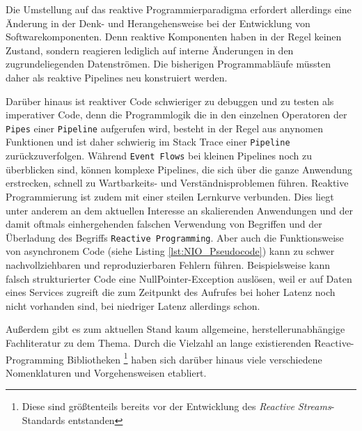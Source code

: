 Die Umstellung auf das reaktive Programmierparadigma erfordert allerdings eine Änderung in der Denk- und Herangehensweise bei der
Entwicklung von Softwarekomponenten. Denn reaktive Komponenten haben in der Regel keinen Zustand,
sondern reagieren lediglich auf interne Änderungen in den zugrundeliegenden Datenströmen.
Die bisherigen Programmabläufe müssten daher als reaktive Pipelines neu konstruiert werden.

Darüber hinaus ist reaktiver Code schwieriger zu debuggen und zu testen als imperativer Code, denn die Programmlogik die in den einzelnen Operatoren
der \verb|Pipes| einer \verb|Pipeline| aufgerufen wird, besteht in der Regel aus anynomen Funktionen und ist daher schwierig im Stack Trace einer
\verb|Pipeline| zurückzuverfolgen.
Während \verb|Event Flows| bei kleinen Pipelines noch zu überblicken sind, können komplexe Pipelines, die sich über die ganze Anwendung erstrecken,
schnell zu Wartbarkeits- und Verständnisproblemen führen.
Reaktive Programmierung ist zudem mit einer steilen Lernkurve verbunden. Dies liegt unter anderem an dem aktuellen Interesse an skalierenden
Anwendungen und der damit oftmals einhergehenden falschen Verwendung von Begriffen und der Überladung des Begriffs \verb|Reactive Programming|.
Aber auch die Funktionsweise von asynchronem Code (siehe Listing \ref{lst:NIO_Pseudocode}) kann zu schwer nachvollziehbaren und
reproduzierbaren Fehlern führen. Beispielsweise kann falsch strukturierter Code eine NullPointer-Exception auslösen, weil
er auf Daten eines Services zugreift die zum Zeitpunkt des Aufrufes bei hoher Latenz noch nicht vorhanden sind, bei niedriger Latenz
allerdings schon.

Außerdem gibt es zum aktuellen Stand kaum allgemeine, herstellerunabhängige Fachliteratur zu dem Thema.
Durch die Vielzahl an lange existierenden Reactive-Programming Bibliotheken
\footnote{Diese sind größtenteils bereits vor der Entwicklung des \textit{Reactive Streams}-Standards entstanden}
haben sich darüber hinaus viele verschiedene Nomenklaturen und Vorgehensweisen etabliert.

